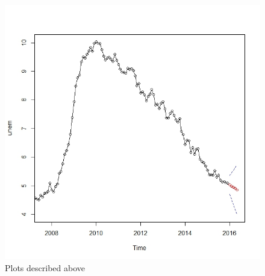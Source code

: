 \documentclass[twoside,twocolumn]{article}
\begin{document}
 \begin{figure}[htb]
    	\centering
     	\caption{Plots described above}
     	\includegraphics[width=.9\linewidth]{images/fore1}
 \end{figure}
 
\end{document}
